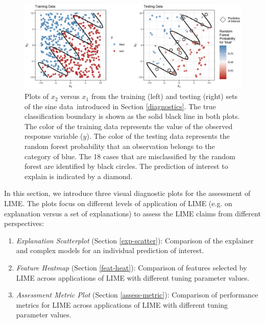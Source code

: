 \documentclass[AMS,STIX2COL]{WileyNJD-v2}\usepackage[]{graphicx}\usepackage[]{color}
\newenvironment{knitrout}{}{} %
\newcommand{\data}{sine data}
\begin{document}
\begin{figure}[!thp]
\centering
\begin{knitrout}
\color{fgcolor}

{\centering \includegraphics[width=6.5in]{figure-03-1} 

}



\end{knitrout}
\caption{Plots of $x_2$ versus $x_1$ from the training (left) and testing (right) sets of the \data \ introduced in Section \ref{diagnostics}. The true classification boundary is shown as the solid black line in both plots. The color of the training data  represents the value of the observed response variable ($y$). The color of the testing data  represents the random forest probability that an observation belongs to the category of blue. The 18 cases that are misclassified by the random forest are identified by black circles. The prediction of interest to explain is indicated by a diamond.}
\label{fig:figure-03}
\end{figure}





In this section, we introduce three visual diagnostic plots for the assessment of LIME. The plots focus on different levels of application of LIME (e.g. on explanation versus a set of explanations) to assess the LIME claims from different perspectives:

\begin{enumerate}
\item \emph{Explanation Scatterplot} (Section \ref{exp-scatter}): Comparison of the explainer and complex models for an individual prediction of interest.
\item \emph{Feature Heatmap} (Section \ref{feat-heat}): Comparison of features selected by LIME across applications of LIME with different tuning parameter values.
\item \emph{Assessment Metric Plot} (Section \ref{assess-metric}): Comparison of performance metrics for LIME across applications of LIME with different tuning parameter values. 
\end{enumerate}
\end{document}
